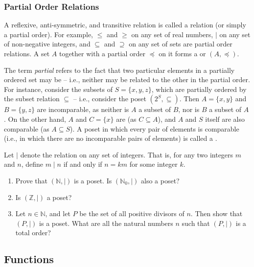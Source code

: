 \subsubsection{Partial Order Relations}

A reflexive, anti-symmetric, and transitive relation is called a  relation (or simply a partial order). For example, $\le$ and $\ge$ on any set of real numbers, $\mid$ on any set of non-negative integers, and $\subseteq$ and $\supseteq$ on any set of sets are partial order relations. A set $A$ together with a partial order $\preccurlyeq$ on it forms a  or  $(A, \preccurlyeq)$.

\begin{Note*}
The term \emph{partial} refers to the fact that two particular elements in a partially ordered set may be  -- i.e., neither may be related to the other in the partial order. For instance, consider the subsets of $S = \{x, y, z\}$, which are partially ordered by the subset relation $\subseteq$ -- i.e., consider the poset $(2^S, \subseteq)$. Then $A = \{x, y\}$ and $B =\{y, z\}$ are incomparable, as neither is $A$ a subset of $B$, nor is $B$ a subset of $A$. On the other hand, $A$ and $C = \{x\}$ are  (as $C \subseteq A$), and $A$ and $S$ itself are also comparable (as $A \subseteq S$). A poset in which every pair of elements is comparable (i.e., in which there are no incomparable pairs of elements) is called a .
\end{Note*}

\begin{Exercise}\label{exer:DividesRel}
Let $\mid$ denote the  relation on any set of integers. That is, for any two integers $m$ and $n$, define $m \mid n$ if and only if $n = km$ for some integer $k$.
\begin{enumerate}
\item Prove that $(\mathbb N, \mid)$ is a poset. Is $(\mathbb N_0, \mid)$ also a poset?
\item Is $(\mathbb Z, \mid)$ a poset?
\item Let $n \in \mathbb N$, and let $P$ be the set of all positive divisors of $n$. Then show that $(P, \mid)$ is a poset. What are all the natural numbers $n$ such that $(P, \mid)$ is a total order?
\end{enumerate}
\end{Exercise}

\subsection{Functions}\label{subsec:Functions}

